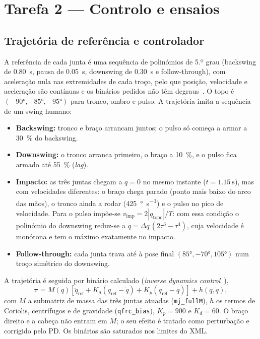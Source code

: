 \documentclass[11pt,a4paper]{article}
\begin{document}
\section{Tarefa 2 --- Controlo e ensaios}

\subsection{Trajetória de referência e controlador}
\label{sec:controlo}

A referência de cada junta é uma sequência de polinómios de 5.º grau
(backswing de \SI{0.80}{\second}, pausa de \SI{0.05}{\second}, downswing de
\SI{0.30}{\second} e follow-through), com aceleração nula nas extremidades de
cada troço, pelo que posição, velocidade e aceleração são contínuas e os
binários pedidos não têm degraus~\cite{sequeira2024}. O topo é
$(\ang{-90}, \ang{-85}, \ang{-95})$ para tronco, ombro e pulso. A trajetória
imita a sequência de um swing humano:

\begin{itemize}
  \item \textbf{Backswing:} tronco e braço arrancam juntos; o pulso só começa a
        armar a \SI{30}{\percent} do backswing.
  \item \textbf{Downswing:} o tronco arranca primeiro, o braço a
        \SI{10}{\percent}, e o pulso fica armado até \SI{55}{\percent}
        (\emph{lag}).
  \item \textbf{Impacto:} as três juntas chegam a $q=0$ no mesmo instante
        ($t=\SI{1.15}{\second}$), mas com velocidades diferentes: o braço chega
        parado (ponto mais baixo do arco das mãos), o tronco ainda a rodar
        (\SI{425}{\degree\per\second}) e o pulso no pico de velocidade. Para o
        pulso impõe-se $v_{\text{imp}} = 2|q_{\text{topo}}|/T$: com essa
        condição o polinómio do downswing reduz-se a
        $q = \Delta q\,(2\tau^3 - \tau^4)$, cuja velocidade é monótona e tem o
        máximo exatamente no impacto.
  \item \textbf{Follow-through:} cada junta trava até à pose final
        $(\ang{85}, \ang{-70}, \ang{105})$ num troço simétrico do downswing.
\end{itemize}

A trajetória é seguida por binário calculado (\emph{inverse dynamics
control}~\cite{siciliano2009,sequeira2024}),
\begin{equation}
  \boldsymbol\tau = M(q)\left[\ddot q_{\text{ref}}
      + K_d\left(\dot q_{\text{ref}} - \dot q\right)
      + K_p\left(q_{\text{ref}} - q\right)\right] + h(q,\dot q),
  \label{eq:ct}
\end{equation}
com $M$ a submatriz de massa das três juntas atuadas (\texttt{mj\_fullM}), $h$
os termos de Coriolis, centrífugos e de gravidade (\texttt{qfrc\_bias}),
$K_p = 900$ e $K_d = 60$. O braço direito e a cabeça não entram em $M$; o seu
efeito é tratado como perturbação e corrigido pelo PD. Os binários são saturados
nos limites do XML.
\end{document}
